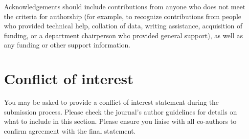 \documentclass[alpha-refs]{wiley-article}
\begin{document}
Acknowledgements should include contributions from anyone who does not
meet the criteria for authorship (for example, to recognize
contributions from people who provided technical help, collation of
data, writing assistance, acquisition of funding, or a department
chairperson who provided general support), as well as any funding or
other support information.

\section{Conflict of interest}

{\label{644442}}

You may be asked to provide a conflict of interest statement during the
submission process. Please check the journal's author guidelines for
details on what to include in this section. Please ensure you liaise
with all co-authors to confirm agreement with the final statement.

\FloatBarrier

\end{document}
